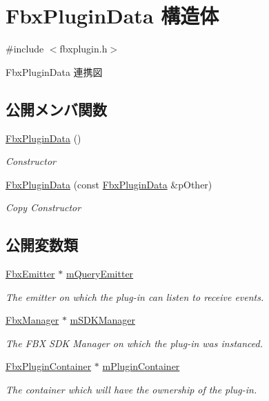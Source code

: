 \hypertarget{struct_fbx_plugin_data}{}\section{Fbx\+Plugin\+Data 構造体}
\label{struct_fbx_plugin_data}


{\ttfamily \#include $<$fbxplugin.\+h$>$}



Fbx\+Plugin\+Data 連携図
\subsection*{公開メンバ関数}
\begin{DoxyCompactItemize}
\item 
\hyperlink{struct_fbx_plugin_data_a4fb32fb98910a0e08a042710f62cd9bd}{Fbx\+Plugin\+Data} ()
\begin{DoxyCompactList}\small\item\em Constructor \end{DoxyCompactList}\item 
\hyperlink{struct_fbx_plugin_data_a917084f1dce5a4d57fd77aeec548bead}{Fbx\+Plugin\+Data} (const \hyperlink{struct_fbx_plugin_data}{Fbx\+Plugin\+Data} \&p\+Other)
\begin{DoxyCompactList}\small\item\em Copy Constructor \end{DoxyCompactList}\end{DoxyCompactItemize}
\subsection*{公開変数類}
\begin{DoxyCompactItemize}
\item 
\hyperlink{class_fbx_emitter}{Fbx\+Emitter} $\ast$ \hyperlink{struct_fbx_plugin_data_a56d73d6518e4691e6f119b8362f1dff6}{m\+Query\+Emitter}
\begin{DoxyCompactList}\small\item\em The emitter on which the plug-\/in can listen to receive events. \end{DoxyCompactList}\item 
\hyperlink{class_fbx_manager}{Fbx\+Manager} $\ast$ \hyperlink{struct_fbx_plugin_data_abf03db73893382d5b5c7d46a3485f53d}{m\+S\+D\+K\+Manager}
\begin{DoxyCompactList}\small\item\em The F\+BX S\+DK Manager on which the plug-\/in was instanced. \end{DoxyCompactList}\item 
\hyperlink{class_fbx_plugin_container}{Fbx\+Plugin\+Container} $\ast$ \hyperlink{struct_fbx_plugin_data_aa77748ca8ef7942f31b0c29aadc8d789}{m\+Plugin\+Container}
\begin{DoxyCompactList}\small\item\em The container which will have the ownership of the plug-\/in. \end{DoxyCompactList}\end{DoxyCompactItemize}


